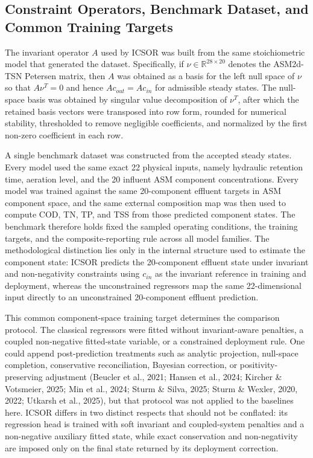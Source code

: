 \documentclass[a4paper,fleqn]{cas-sc}
\newenvironment{currentrevblock}{\begingroup\color{currentRevisionBlue}}{\endgroup}
\newenvironment{currentrevblock}{}{}
\newenvironment{revblock}{}{}
\newenvironment{revblockr22}{}{}
\begin{document}
\begin{revblock}
\begin{revblockr22}
\subsection{Constraint Operators, Benchmark Dataset, and Common Training Targets}

The invariant operator $A$ used by ICSOR was built from the same stoichiometric model that generated the dataset. Specifically, if $\nu \in \mathbb{R}^{28 \times 20}$ denotes the ASM2d-TSN Petersen matrix, then $A$ was obtained as a basis for the left null space of $\nu$ so that $A\nu^T=0$ and hence $Ac_{out}=Ac_{in}$ for admissible steady states. The null-space basis was obtained by singular value decomposition of $\nu^T$, after which the retained basis vectors were transposed into row form, rounded for numerical stability, thresholded to remove negligible coefficients, and normalized by the first non-zero coefficient in each row.

A single benchmark dataset was constructed from the accepted steady states. Every model used the same exact 22 physical inputs, namely hydraulic retention time, aeration level, and the 20 influent ASM component concentrations. Every model was trained against the same 20-component effluent targets in ASM component space, and the same external composition map was then used to compute COD, TN, TP, and TSS from those predicted component states. The benchmark therefore holds fixed the sampled operating conditions, the training targets, and the composite-reporting rule across all model families. The methodological distinction lies only in the internal structure used to estimate the component state: ICSOR predicts the 20-component effluent state under invariant and non-negativity constraints using $c_{in}$ as the invariant reference in training and deployment, whereas the unconstrained regressors map the same 22-dimensional input directly to an unconstrained 20-component effluent prediction.

\begin{currentrevblock}
This common component-space training target determines the comparison protocol. The classical regressors were fitted without invariant-aware penalties, a coupled non-negative fitted-state variable, or a constrained deployment rule. One could append post-prediction treatments such as analytic projection, null-space completion, conservative reconciliation, Bayesian correction, or positivity-preserving adjustment (Beucler et al., 2021; Hansen et al., 2024; Kircher \& Votsmeier, 2025; Min et al., 2024; Sturm \& Silva, 2025; Sturm \& Wexler, 2020, 2022; Utkarsh et al., 2025), but that protocol was not applied to the baselines here. ICSOR differs in two distinct respects that should not be conflated: its regression head is trained with soft invariant and coupled-system penalties and a non-negative auxiliary fitted state, while exact conservation and non-negativity are imposed only on the final state returned by its deployment correction.
\end{currentrevblock}
\end{revblockr22}


\end{revblock}
\end{document}
